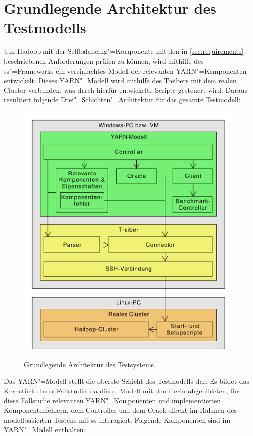 \section{Grundlegende Architektur des Testmodells}
\label{sec:modelArchitecture}

Um Hadoop mit der Selfbalancing"=Komponente mit den in \cref{sec:requirements} beschriebenen Anforderungen prüfen zu können, wird mithilfe des \gls{ss}"=Frameworks ein vereinfachtes Modell der relevanten \gls{YARN}"=Komponenten entwickelt.
Dieses \gls{YARN}"=Modell wird mithilfe des Treibers mit dem realen Cluster verbunden, was durch hierfür entwickelte Scripte gesteuert wird.
Daraus resultiert folgende Drei"=Schichten"=Architektur für das gesamte Testmodell:

\begin{figure}[h]
    \includegraphics[width=0.6\columnwidth]{./resources/modelArchitecture.pdf}
    \caption{Grundlegende Architektur des Testsystems}
    \label{fig:modelArchitecture}
\end{figure}

Das \gls{YARN}"=Modell stellt die oberste Schicht des Testmodells dar.
Es bildet das Kernstück dieser Fallstudie, da dieses Modell mit den hierin abgebildeten, für diese Fallstudie relevanten \gls{YARN}"=Komponenten und implementierten Komponentenfehlern, dem Controller und dem Oracle direkt im Rahmen des modellbasierten Testens mit \gls{ss} interagiert.
Folgende Komponenten sind im \gls{YARN}"=Modell enthalten:

